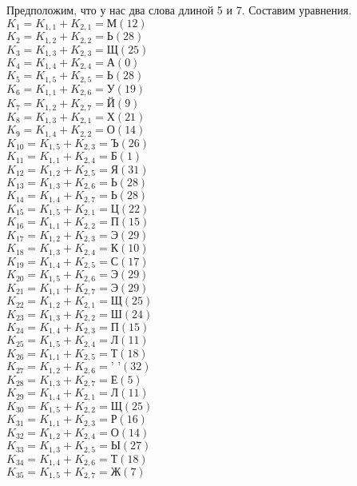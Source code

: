 \documentclass[12pt, a4paper] {ncc}
\begin{document}
	Предположим, что у нас два слова длиной 5 и 7. Составим уравнения.\\
	$K_1 = K_{1,1} + K_{2,1} = \text{М} (12)$ \\
	$K_2 = K_{1,2} + K_{2,2} = \text{Ь} (28)$ \\
	$K_3 = K_{1,3} + K_{2,3} = \text{Щ} (25)$ \\
	$K_4 = K_{1,4} + K_{2,4} = \text{А} (0)$ \\
	$K_5 = K_{1,5} + K_{2,5} = \text{Ь} (28)$ \\
	$K_6 = K_{1,1} + K_{2,6} = \text{У} (19)$ \\
	$K_7 = K_{1,2} + K_{2,7} = \text{Й} (9)$ \\
	$K_8 = K_{1,3} + K_{2,1} = \text{Х} (21)$ \\
	$K_9 = K_{1,4} + K_{2,2} = \text{О} (14)$ \\
	$K_{10} = K_{1,5} + K_{2,3} = \text{Ъ} (26) $\\
	$K_{11} = K_{1,1} + K_{2,4} = \text{Б} (1) $\\
	$K_{12} = K_{1,2} + K_{2,5} = \text{Я} (31) $\\
	$K_{13} = K_{1,3} + K_{2,6} = \text{Ь} (28) $\\
	$K_{14} = K_{1,4} + K_{2,7} = \text{Ь} (28) $\\
	$K_{15} = K_{1,5} + K_{2,1} = \text{Ц} (22) $\\
	$K_{16} = K_{1,1} + K_{2,2} = \text{П} (15) $\\
	$K_{17} = K_{1,2} + K_{2,3} = \text{Э} (29) $\\
	$K_{18} = K_{1,3} + K_{2,4} = \text{К} (10) $\\
	$K_{19} = K_{1,4} + K_{2,5} = \text{С} (17) $\\
	$K_{20} = K_{1,5} + K_{2,6} = \text{Э} (29) $\\
	$K_{21} = K_{1,1} + K_{2,7} = \text{Э} (29) $\\
	$K_{22} = K_{1,2} + K_{2,1} = \text{Щ} (25) $\\
	$K_{23} = K_{1,3} + K_{2,2} = \text{Ш} (24) $\\
	$K_{24} = K_{1,4} + K_{2,3} = \text{П} (15) $\\
	$K_{25} = K_{1,5} + K_{2,4} = \text{Л} (11) $\\
	$K_{26} = K_{1,1} + K_{2,5} = \text{Т} (18) $\\
	$K_{27} = K_{1,2} + K_{2,6} = \text{' '} (32)$\\
	$K_{28} = K_{1,3} + K_{2,7} = \text{Е} (5) $\\
	$K_{29} = K_{1,4} + K_{2,1} = \text{Л} (11) $\\
	$K_{30} = K_{1,5} + K_{2,2} = \text{Щ} (25) $\\
	$K_{31} = K_{1,1} + K_{2,3} = \text{Р} (16) $\\
	$K_{32} = K_{1,2} + K_{2,4} = \text{О} (14) $\\
	$K_{33} = K_{1,3} + K_{2,5} = \text{Ы} (27) $\\
	$K_{34} = K_{1,4} + K_{2,6} = \text{Т} (18) $\\
	$K_{35} = K_{1,5} + K_{2,7} = \text{Ж} (7) $\\
\end{document}
